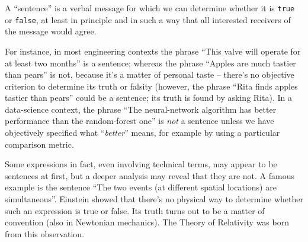 \documentclass[
  a4paper,
  DIV=11,
  numbers=noendperiod,
  oneside]{scrreprt}
\begin{document}

\begin{tcolorbox}[enhanced jigsaw, colback=white, titlerule=0mm, toptitle=1mm, breakable, colbacktitle=quarto-callout-note-color!10!white, opacitybacktitle=0.6, colframe=quarto-callout-note-color-frame, opacityback=0, arc=.35mm, leftrule=.75mm, title={}, left=2mm, bottomtitle=1mm, rightrule=.15mm, bottomrule=.15mm, toprule=.15mm, coltitle=black]

{A ``sentence'' is a verbal message for which we can determine whether
it is \texttt{true} or \texttt{false}, at least in principle and in such
a way that all interested receivers of the message would agree.}

\end{tcolorbox}

For instance, in most engineering contexts the phrase ``{This valve will
operate for at least two months}'' is a sentence; whereas the phrase
``{Apples are much tastier than pears}'' is not, because it's a matter
of personal taste -- there's no objective criterion to determine its
truth or falsity (however, the phrase ``{Rita finds apples tastier than
pears}'' could be a sentence; its truth is found by asking Rita). In a
data-science context, the phrase ``{The neural-network algorithm has
better performance than the random-forest one}'' is \emph{not} a
sentence unless we have objectively specified what ``\emph{better}''
means, for example by using a particular comparison metric.

Some expressions in fact, even involving technical terms, may appear to
be sentences at first, but a deeper analysis may reveal that they are
not. A famous example is the sentence ``{The two events (at different
spatial locations) are simultaneous}''. Einstein showed that there's no
physical way to determine whether such an expression is true or false.
Its truth turns out to be a matter of convention (also in Newtonian
mechanics). The Theory of Relativity was born from this observation.
\end{document}
